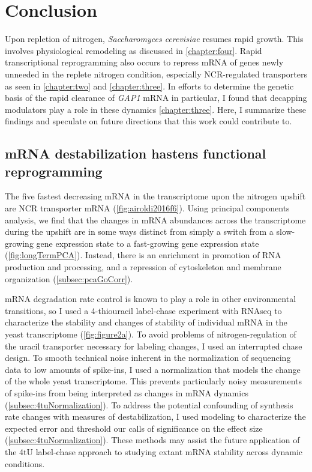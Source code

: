\chapter{Conclusion}
\label{chapter:five}


Upon repletion of nitrogen, \textit{Saccharomyces cerevisiae} 
resumes rapid growth.
This involves physiological remodeling as discussed in
\autoref{chapter:four}.
Rapid transcriptional reprogramming also occurs to repress mRNA of 
genes newly unneeded in the replete nitrogen condition, especially
NCR-regulated transporters as seen in \autoref{chapter:two} and
\autoref{chapter:three}.
In efforts to determine the genetic basis of the rapid clearance of
\textit{GAP1} mRNA in particular, I found that decapping modulators
play a role in these dynamics \autoref{chapter:three}. 
Here, I summarize these findings and speculate on future
directions that this work could contribute to.

\section{mRNA destabilization hastens functional reprogramming}

The five fastest decreasing mRNA in the transcriptome upon the
nitrogen upshift are NCR transporter mRNA 
(\autoref{fig:airoldi2016f6}).
Using principal components analysis, 
we find that the changes in mRNA abundances across the transcriptome
during the upshift are in some ways distinct from simply a switch
from a slow-growing gene expression state to a fast-growing gene
expression state (\autoref{fig:longTermPCA}).
Instead, there is an enrichment in promotion of RNA production and
processing, and a repression of cytoskeleton and membrane
organization (\autoref{subsec:pcaGoCorr}).

mRNA degradation rate control is known to play a role in other
environmental transitions, so I used a 4-thiouracil label-chase
experiment with RNAseq to characterize the stability and changes
of stability of individual mRNA in the yeast transcriptome 
(\autoref{fig:figure2a}).
To avoid problems of nitrogen-regulation of the uracil transporter
necessary for labeling changes, I used an interrupted chase
design.
To smooth technical noise inherent in the normalization of sequencing
data to low amounts of spike-ins, I used a normalization that models
the change of the whole yeast transcriptome.
This prevents particularly noisy measurements of spike-ins from 
being interpreted as changes in mRNA dynamics 
(\autoref{subsec:4tuNormalization}).
To address the potential confounding of synthesis rate changes with
measures of destabilization, I used modeling to characterize the
expected error and threshold our calls of significance on the
effect size (\autoref{subsec:4tuNormalization}).
These methods may assist the future application of the 4tU label-chase
approach to studying extant mRNA stability across dynamic conditions.

